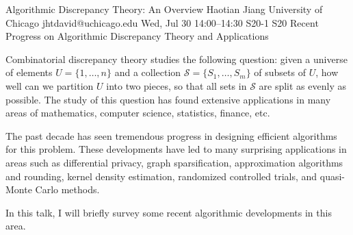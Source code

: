 \begin{talk}
  {Algorithmic Discrepancy Theory: An Overview}%
  {Haotian Jiang}%
  {University of Chicago}%
  {jhtdavid@uchicago.edu}%
  {}%
  {}%
  {Wed, Jul 30 14:00--14:30}%
  {S20-1}%
  {S20}%
  {}
  {Recent Progress on Algorithmic Discrepancy Theory and Applications}
    
   
Combinatorial discrepancy theory studies the following question: given a universe of elements $U=\{1,\ldots, n\}$ and a collection $\mathcal{S} = \{S_1, \ldots, S_m\}$ of subsets of $U$, how well can we partition $U$ into two pieces, so that all sets in $\mathcal{S}$ are split as evenly as possible.
The study of this question has found extensive applications in many areas of mathematics, computer science, statistics, finance, etc. 

The past decade has seen tremendous progress in designing efficient algorithms for this problem. These developments have led to many surprising applications in areas such as differential privacy, graph sparsification, approximation algorithms and rounding, kernel density estimation, randomized controlled trials, and quasi-Monte Carlo methods.

In this talk, I will briefly survey some recent algorithmic developments in this area. 



\end{talk}

